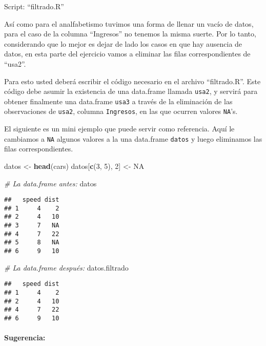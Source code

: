 \documentclass[]{article}
\newenvironment{Shaded}{}{}
\newcommand{\KeywordTok}[1]{\textcolor[rgb]{0.00,0.44,0.13}{\textbf{{#1}}}}
\newcommand{\DecValTok}[1]{\textcolor[rgb]{0.25,0.63,0.44}{{#1}}}
\newcommand{\StringTok}[1]{\textcolor[rgb]{0.25,0.44,0.63}{{#1}}}
\newcommand{\CommentTok}[1]{\textcolor[rgb]{0.38,0.63,0.69}{\textit{{#1}}}}
\newcommand{\OtherTok}[1]{\textcolor[rgb]{0.00,0.44,0.13}{{#1}}}
\newcommand{\NormalTok}[1]{{#1}}
\begin{document}
Script: ``filtrado.R''

Así como para el analfabetismo tuvimos una forma de llenar un vacío de
datos, para el caso de la columna ``Ingresos'' no tenemos la misma
suerte. Por lo tanto, considerando que lo mejor es dejar de lado los
casos en que hay ausencia de datos, en esta parte del ejercicio vamos a
eliminar las filas correspondientes de ``usa2''.

Para esto usted deberá escribir el código necesario en el archivo
``filtrado.R''. Este código debe asumir la existencia de una data.frame
llamada \texttt{usa2}, y servirá para obtener finalmente una data.frame
\texttt{usa3} a través de la eliminación de las observaciones de
\texttt{usa2}, columna \texttt{Ingresos}, en las que ocurren valores
\texttt{NA}'s.

El siguiente es un mini ejemplo que puede servir como referencia. Aquí
le cambiamos a \texttt{NA} algunos valores a la una data.frame
\texttt{datos} y luego eliminamos las filas correspondientes.

\begin{Shaded}
\begin{Highlighting}[]
\NormalTok{datos <-}\StringTok{ }\KeywordTok{head}\NormalTok{(cars)}
\NormalTok{datos[}\KeywordTok{c}\NormalTok{(}\DecValTok{3}\NormalTok{, }\DecValTok{5}\NormalTok{), }\DecValTok{2}\NormalTok{] <-}\StringTok{ }\OtherTok{NA}

\CommentTok{# La data.frame antes:}
\NormalTok{datos}
\end{Highlighting}
\end{Shaded}

\begin{verbatim}
##   speed dist
## 1     4    2
## 2     4   10
## 3     7   NA
## 4     7   22
## 5     8   NA
## 6     9   10
\end{verbatim}

\begin{Shaded}
\begin{Highlighting}[]
\CommentTok{# La data.frame después:}
\NormalTok{datos.filtrado}
\end{Highlighting}
\end{Shaded}

\begin{verbatim}
##   speed dist
## 1     4    2
## 2     4   10
## 4     7   22
## 6     9   10
\end{verbatim}

\paragraph{Sugerencia:}
\end{document}
